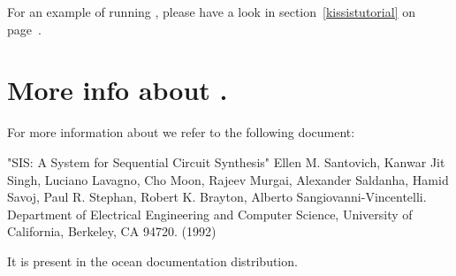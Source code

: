 For an example of running , please have a look in 
section~\ref{kissistutorial} on page~\pageref{kissistutorial}.

\section{More info about \protect{}.}
For more information about \protect{} we refer to the following
document:

"SIS: A System for Sequential Circuit Synthesis" Ellen M. Santovich, Kanwar Jit
Singh, Luciano Lavagno, Cho Moon, Rajeev Murgai, Alexander Saldanha, Hamid
Savoj,  Paul R. Stephan, Robert K. Brayton, Alberto Sangiovanni-Vincentelli.
Department of Electrical Engineering and Computer Science, University of
California, Berkeley, CA 94720. (1992)

It is present in the ocean documentation distribution.



